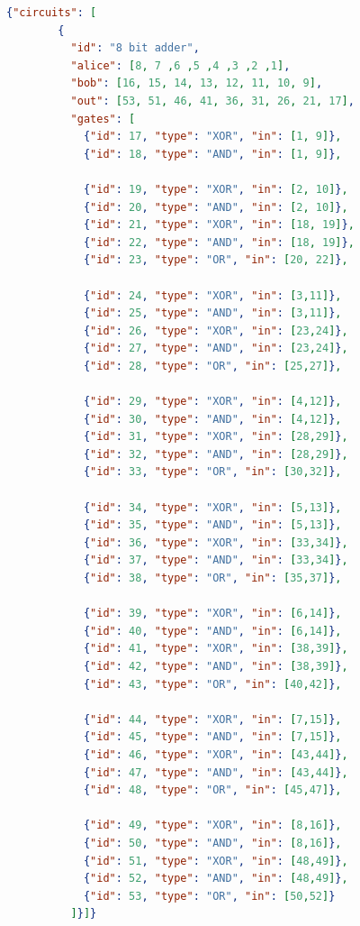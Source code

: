 \documentclass[12pt]{article}
\begin{document}
\begin{lstlisting}[language=json,firstnumber=1]
    {"circuits": [
        {
          "id": "8 bit adder",
          "alice": [8, 7 ,6 ,5 ,4 ,3 ,2 ,1],
          "bob": [16, 15, 14, 13, 12, 11, 10, 9],
          "out": [53, 51, 46, 41, 36, 31, 26, 21, 17],
          "gates": [
            {"id": 17, "type": "XOR", "in": [1, 9]},
            {"id": 18, "type": "AND", "in": [1, 9]},
  
            {"id": 19, "type": "XOR", "in": [2, 10]},
            {"id": 20, "type": "AND", "in": [2, 10]},
            {"id": 21, "type": "XOR", "in": [18, 19]},
            {"id": 22, "type": "AND", "in": [18, 19]},
            {"id": 23, "type": "OR", "in": [20, 22]},
  
            {"id": 24, "type": "XOR", "in": [3,11]},
            {"id": 25, "type": "AND", "in": [3,11]},
            {"id": 26, "type": "XOR", "in": [23,24]},
            {"id": 27, "type": "AND", "in": [23,24]},
            {"id": 28, "type": "OR", "in": [25,27]},
          
            {"id": 29, "type": "XOR", "in": [4,12]},
            {"id": 30, "type": "AND", "in": [4,12]},
            {"id": 31, "type": "XOR", "in": [28,29]},
            {"id": 32, "type": "AND", "in": [28,29]},
            {"id": 33, "type": "OR", "in": [30,32]},
  
            {"id": 34, "type": "XOR", "in": [5,13]},
            {"id": 35, "type": "AND", "in": [5,13]},
            {"id": 36, "type": "XOR", "in": [33,34]},
            {"id": 37, "type": "AND", "in": [33,34]},
            {"id": 38, "type": "OR", "in": [35,37]},
  
            {"id": 39, "type": "XOR", "in": [6,14]},
            {"id": 40, "type": "AND", "in": [6,14]},
            {"id": 41, "type": "XOR", "in": [38,39]},
            {"id": 42, "type": "AND", "in": [38,39]},
            {"id": 43, "type": "OR", "in": [40,42]},
  
            {"id": 44, "type": "XOR", "in": [7,15]},
            {"id": 45, "type": "AND", "in": [7,15]},
            {"id": 46, "type": "XOR", "in": [43,44]},
            {"id": 47, "type": "AND", "in": [43,44]},
            {"id": 48, "type": "OR", "in": [45,47]},
  
            {"id": 49, "type": "XOR", "in": [8,16]},
            {"id": 50, "type": "AND", "in": [8,16]},
            {"id": 51, "type": "XOR", "in": [48,49]},
            {"id": 52, "type": "AND", "in": [48,49]},
            {"id": 53, "type": "OR", "in": [50,52]}
          ]}]}
    \end{lstlisting}
\end{document}
